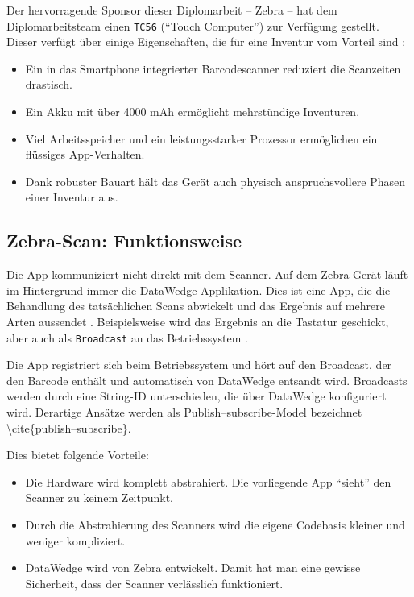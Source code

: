 Der hervorragende Sponsor dieser Diplomarbeit -- Zebra -- hat dem
Diplomarbeitsteam einen \texttt{TC56} (``Touch Computer'') zur Verfügung
gestellt. Dieser verfügt über einige Eigenschaften, die für eine
Inventur vom Vorteil sind \cite{zebra-tc56}:

\begin{itemize}
\tightlist
\item
  Ein in das Smartphone integrierter Barcodescanner reduziert die
  Scanzeiten drastisch.
\item
  Ein Akku mit über 4000 mAh ermöglicht mehrstündige Inventuren.
\item
  Viel Arbeitsspeicher und ein leistungsstarker Prozessor ermöglichen
  ein flüssiges App-Verhalten.
\item
  Dank robuster Bauart hält das Gerät auch physisch anspruchsvollere
  Phasen einer Inventur aus.
\end{itemize}

\hypertarget{zebra-scan-funktionsweise}{%
\subsection{Zebra-Scan:
Funktionsweise}\label{zebra-scan-funktionsweise}}

Die App kommuniziert nicht direkt mit dem Scanner. Auf dem Zebra-Gerät
läuft im Hintergrund immer die DataWedge-Applikation. Dies ist eine App,
die die Behandlung des tatsächlichen Scans abwickelt und das Ergebnis
auf mehrere Arten aussendet \cite{datawedge}. Beispielsweise wird das
Ergebnis an die Tastatur geschickt, aber auch als \texttt{Broadcast} an
das Betriebssystem \cite{broadcast}.

Die App registriert sich beim Betriebssystem und hört auf den Broadcast,
der den Barcode enthält und automatisch von DataWedge entsandt wird.
Broadcasts werden durch eine String-ID unterschieden, die über DataWedge
konfiguriert wird. Derartige Ansätze werden als Publish--subscribe-Model
bezeichnet \textbackslash cite\{publish--subscribe\}.

Dies bietet folgende Vorteile:

\begin{itemize}
\tightlist
\item
  Die Hardware wird komplett abstrahiert. Die vorliegende App ``sieht''
  den Scanner zu keinem Zeitpunkt.
\item
  Durch die Abstrahierung des Scanners wird die eigene Codebasis kleiner
  und weniger kompliziert.
\item
  DataWedge wird von Zebra entwickelt. Damit hat man eine gewisse
  Sicherheit, dass der Scanner verlässlich funktioniert.
\end{itemize}


